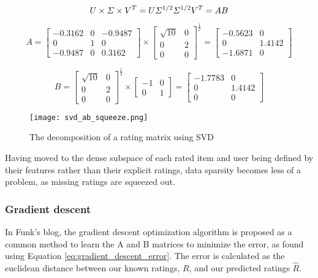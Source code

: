 \begin{equation}\label{eq:svd_AB_squeezing}
	\centering
	U\times \Sigma \times V^T = U\Sigma^{1/2} \Sigma^{1/2}V^T = AB
\end{equation}

\begin{equation}\label{eq:svd_AB_num_squeezing_A}
A = \begin{bmatrix}
-0.3162 & 0 & -0.9487\\ 
0 & 1 & 0\\ 
-0.9487 & 0 & 0.3162
\end{bmatrix} \times
\begin{bmatrix}
\sqrt{10} & 0\\ 
0 & 2\\ 
0 & 0
\end{bmatrix}^{\frac{1}{2}} =
\begin{bmatrix}
-0.5623 & 0\\ 
0 & 1.4142\\ 
-1.6871 & 0
\end{bmatrix}
\end{equation}

\begin{equation}\label{eq:svd_AB_num_squeezing_B}
B = \begin{bmatrix}
\sqrt{10} & 0\\ 
0 & 2\\ 
0 & 0
\end{bmatrix}^{\frac{1}{2}} \times
\begin{bmatrix}
-1 & 0\\ 
0 & 1
\end{bmatrix} =
\begin{bmatrix}
-1.7783 & 0\\ 
0 & 1.4142\\ 
0 & 0
\end{bmatrix}
\end{equation}

\begin{figure}[H]
	\centering
	\texttt{[image: svd\_ab\_squeeze.png]}
	\caption{The decomposition of a rating matrix using SVD\cite{recsys_svd}}
	\label{fig:svdSqueeze}
\end{figure}
Having moved to the dense subspace of each rated item and user being defined by their features rather than their explicit ratings, data sparsity becomes less of a problem, as missing ratings are squeezed out.

\subsubsection{Gradient descent}
In Funk's blog, the gradient descent optimization algorithm is proposed as a common method to learn the A and B matrices to minimize the error, as found using Equation \ref{eq:gradient_descent_error}. The error is calculated as the euclidean distance between our known ratings, $R$, and our predicted ratings $\hat{R}$\cite{aibook_gradientdescent_localsearch}\cite{aibook_gradientdescent_linearfunc}.

